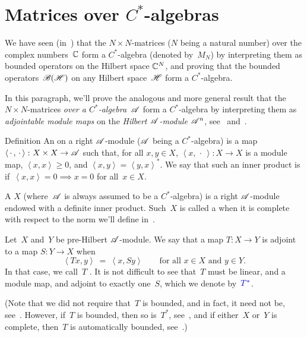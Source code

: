 \documentclass[a]{subfiles}
\begin{document}
\section{Matrices over $C^*$-algebras}
\begin{parsec}%
\begin{point}%

We have seen (in~) that the $N\times N$-matrices
($N$ being a natural number) over the complex numbers~$\mathbb{C}$
form a $C^*$-algebra (denoted by~$M_N$) by interpreting
them as bounded operators on the Hilbert space $\mathbb{C}^N$,
and proving
that the bounded operators~$\mathscr{B}(\mathscr{H})$
on any Hilbert space~$\mathscr{H}$ form a $C^*$-algebra.

In this paragraph, we'll prove the analogous
and more general
result that the 
$N\times N$-matrices \emph{over a $C^*$-algebra~$\mathscr{A}$}
form a $C^*$-algebra by interpreting them
as \emph{adjointable module maps} on
the \emph{Hilbert $\mathscr{A}$-module} $\mathscr{A}^n$,
see~ and~.
\end{point}
\begin{point}{Definition}%
An  on a right $\mathscr{A}$-module
($\mathscr{A}$ being a $C^*$-algebra) is a map
$\left<\,\cdot\,,\,\cdot\,\right>\colon X\times X\to\mathscr{A}$
such that, for all $x,y\in X$,
$\left<x,\,\cdot\,\right>\colon X\to X$
is a module map, $\left<x,x\right>\geq 0$,
and $\left<x,y\right>=\left<y,x\right>^*$.
We say that such an inner product is 
if~$\left<x,x\right>=0\implies x=0$ for all~$x\in X$.

A  $X$
(where~$\mathscr{A}$ is always assumed to be a $C^*$-algebra)
is a right $\mathscr{A}$-module endowed with a definite inner product.
Such~$X$ is called
a 
when it is complete
with respect to
the norm we'll define in~.

Let~$X$ and~$Y$ be pre-Hilbert $\mathscr{A}$-module.
We say that a map $T\colon X\to Y$
is adjoint to a map $S\colon Y\to X$
when
\begin{equation*}
\left<Tx,y\right>\ =\ \left<x,Sy\right>
\qquad \text{for all $x\in X$ and $y\in Y$}.
\end{equation*}
In that case, we call~$T$ .
It is not difficult to see that~$T$
must be linear, and a module map, and 
adjoint to exactly one~$S$, which we denote by~$\Define{T^*}$.

(Note that we did not require that~$T$
is bounded, and in fact, it need not be, 
see~.
However, if~$T$ is bounded, then so is~$T^*$, 
see~,
and if either~$X$ or~$Y$ is complete,
then~$T$ is automatically bounded, see~.)


\end{point}
\end{parsec}
\end{document}
